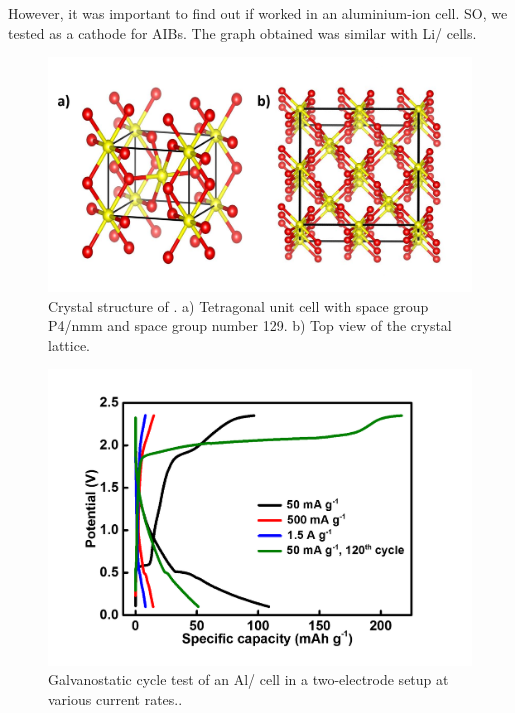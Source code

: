 However, it was important to find out if  worked in an aluminium-ion cell. SO, we tested  as a cathode for AIBs. The graph obtained was similar with Li/ cells.  
 \begin{figure}[tbh!]
  \centering
  \includegraphics[width=\textwidth]{Figures/chap6fig/SnO2crys}
    \caption{Crystal structure of . a) Tetragonal unit cell with space group P4/nmm and space group number 129. b) Top view of the crystal lattice.}
  \label{Figures/chap6fig:SnO2crys}
\end{figure}
 \begin{figure}[tbh!]
  \centering
  \includegraphics[width=\textwidth]{Figures/chap6fig/SnO2CDC}
    \caption{Galvanostatic cycle test of an Al/ cell in a two-electrode setup at various current rates..}
  \label{Figures/chap6fig:SnO2CDC}
\end{figure}

